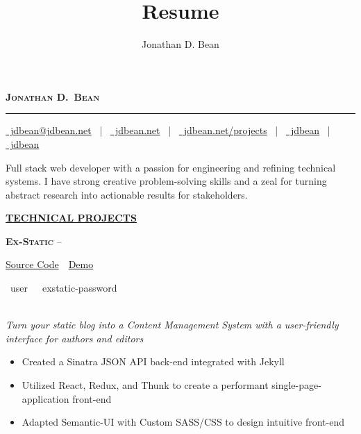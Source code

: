 \documentclass[11pt,letterpaper,english]{article}
\title{Resume}
\author{Jonathan D. Bean}
\date{}
\begin{document}
\label{Header}
\vspace*{-40pt}
\begin{singlespace}
\begin{center}
\textsc{\textbf{\LARGE Jonathan D.\ Bean}}
\vspace{3pt}
\hrule height 1pt
\vspace{4pt}
\small
\href{mailto:jdbean@jdbean.net}{\color{black}\faEnvelope~jdbean@jdbean.net}
~|~
\href{https://jdbean.net}{\color{black}\faGlobe~jdbean.net}
~|~
\href{https://jdbean.net/projects}{\color{black}\faEye~jdbean.net/projects}
~|~
\href{https://github.com/jdbean}{\color{black}\faGithub~jdbean}
~|~
\href{https://gitlab.com/jdbean}{\color{black}\faGitlab~jdbean}\\
\small
\end{center}
\end{singlespace}

\label{Description}
\vspace{-12pt}
\begin{center}
Full stack web developer with a passion for engineering and refining technical systems. I have strong creative problem-solving skills and a zeal for turning abstract research into actionable results for stakeholders.
\end{center}

\label{Technical Projects}
\underline{\textbf{\textsc{\large TECHNICAL PROJECTS}}}{\large \par}
\smallskip

\textbf{\textsc{Ex-Static}} 
--\begin{small}
\href{https://github.com/jdbean/Ex-Static}{Source Code}~\color{darkgray}{|}~\href{https://office.johannabearman.duckdns.org}{Demo}
\end{small}
\begin{scriptsize}
\color{gray}
\faUser~user~~\faKey~exstatic-password
\end{scriptsize}\\
\textit{Turn your static blog into a Content Management System with a user-friendly interface for authors and editors}
\begin{itemize}
\item Created a Sinatra JSON API back-end integrated with Jekyll
\item Utilized React, Redux, and Thunk to create a performant single-page-application front-end
\item Adapted Semantic-UI with Custom SASS/CSS to design intuitive front-end
\end{itemize}
\smallskip
\end{document}
